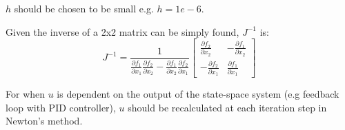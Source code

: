 \documentclass[11pt]{article}
\begin{document}
$h$ should be chosen to be small e.g. $h=1e-6$.

Given the inverse of a 2x2 matrix can be simply found, $J^{-1}$ is:
\begin{equation}
  J^{-1} = \frac{1}{\frac{\partial f_1}{\partial x_1}\frac{\partial f_2}{\partial x_2} - \frac{\partial f_1}{\partial x_2}\frac{\partial f_2}{\partial x_1}}
  \begin{bmatrix}
    \frac{\partial f_2}{\partial x_2} & -\frac{\partial f_1}{\partial x_2} \\
    -\frac{\partial f_2}{\partial x_1} & \frac{\partial f_1}{\partial x_1}
  \end{bmatrix}
\end{equation}

For when $u$ is dependent on the output of the state-space system (e.g feedback loop with PID controller), $u$ should be recalculated at each iteration step in Newton's method.

\end{document}
